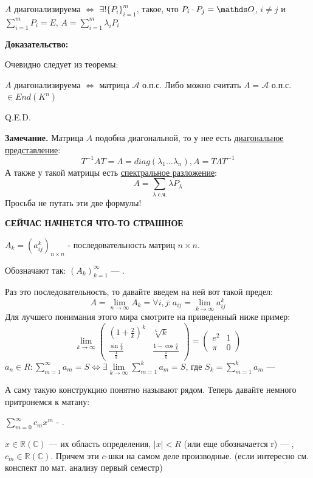 $A$ диагонализируема $\Leftrightarrow$ $\exists! \{P_i\}_{i=1}^m$, такое, что  $P_i \cdot P_j = \zero$, $i\neq j$
и $\sum\limits_{i=1}^m P_i=E$,
$A = \sum\limits_{i=1}^m\lambda_iP_i$

\textbf{Доказательство:}

Очевидно следует из теоремы:

$A$ диагонализируема $\iff$ матрица $\mathcal{A}$ о.п.с. Либо можно считать  $A=\mathcal{A}$ о.п.с.   $\in End (K^n)$

  \hfill Q.E.D.

\textbf{Замечание.} Матрица $A$ подобна диагональной, то у нее есть \uline{диагональное представление}:
$$T^{-1}AT = \Lambda = diag (\lambda_1 \dots \lambda_n), A = T \Lambda T^{-1}$$
А также у такой матрицы есть \uline{спектральное разложение}:
$$A=\sum\limits_{\lambda  \text{ c.ч.}}\lambda P_{\lambda}$$
Просьба не путать эти две формулы!

\textbf{СЕЙЧАС НАЧНЕТСЯ ЧТО-ТО СТРАШНОЕ}

 $A_k = (a_{ij}^k)_{n\times n}$ - последовательность матриц $n\times n$.

Обозначают так: $(A_k)_{k=1}^{\infty}$  --- .

Раз это последовательность, то давайте введем на ней вот такой предел:
$$A = \lim\limits_{n\rightarrow \infty} A_k = \forall i,j: a_{ij}=\lim\limits_{k\rightarrow \infty}a_{ij}^k$$
Для лучшего понимания этого мира смотрите на приведенный ниже пример:
$$\lim\limits_{k\rightarrow \infty}\left(
 \begin{matrix}
 (1+ \frac{2}{k})^k & \sqrt[k]{k} \\
 \frac{\sin \frac{\pi}k}{\frac1k} & \frac{1 - \cos \frac{\pi}k}{\frac{1}{k}}
 \end{matrix}
\right) = \left(
 \begin{matrix}
 e^2 & 1 \\
 \pi & 0
 \end{matrix}
\right)$$
 $a_n \in R: \sum\limits_{m=1}^{\infty}a_m = S \Leftrightarrow
\exists \lim\limits_{k \rightarrow \infty}\sum\limits_{m=1}^k a_m=S$, где $S_k =\sum\limits_{m=1}^k a_m $ --- 

А саму такую конструкцию понятно называют рядом. Теперь давайте немного притронемся к матану:

$\sum\limits_{m=0}^\infty c_mx^m$ - .

$x\in \mathbb{R}(\mathbb{C})$ --- их область определения, $|x| < R$ (или еще обозначается r) --- , $c_m \in \mathbb{R}(\mathbb{C})$. Причем эти $c$-шки на самом деле производные. (если интересно см. конспект по мат. анализу первый семестр)

